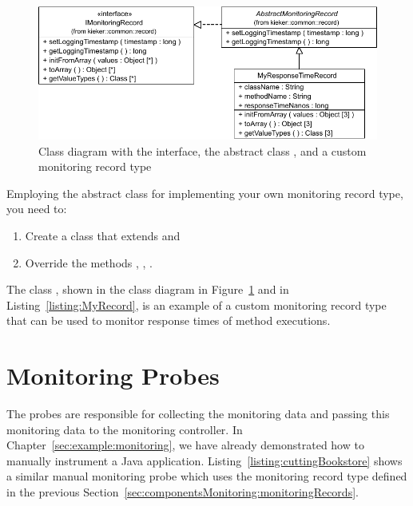 \begin{figure}[h]\centering
\includegraphics[scale=0.7]{images/kieker_MyRTRecord-modified}
\caption{Class diagram with the  interface, the abstract %
class , and a custom monitoring record type %
}
\label{sec:monitoringrecord:interfacesAndImplementingClasses}
\end{figure}

\pagebreak

\noindent Employing the abstract class for implementing your own monitoring record type, you need to:

\begin{enumerate}
\item Create a class that extends   and
\item Override the methods , , .
\end{enumerate}

\noindent The class , shown in the class diagram in %
Figure~\ref{sec:monitoringrecord:interfacesAndImplementingClasses} and in %
Listing~\ref{listing:MyRecord}, is an example of a custom monitoring record type %
that can be used to monitor response times of method executions.

\setJavaCodeListing


\pagebreak

\section{Monitoring Probes}\label{sec:monitoring:probe}

The probes are responsible for collecting the monitoring data and passing this %
monitoring data to the monitoring controller. %
In Chapter~\ref{sec:example:monitoring}, we have already demonstrated how to %
manually instrument a Java application. Listing~\ref{listing:cuttingBookstore} %
shows a similar manual monitoring probe which uses the monitoring record type %
 defined in the previous Section~\ref{sec:componentsMonitoring:monitoringRecords}.

